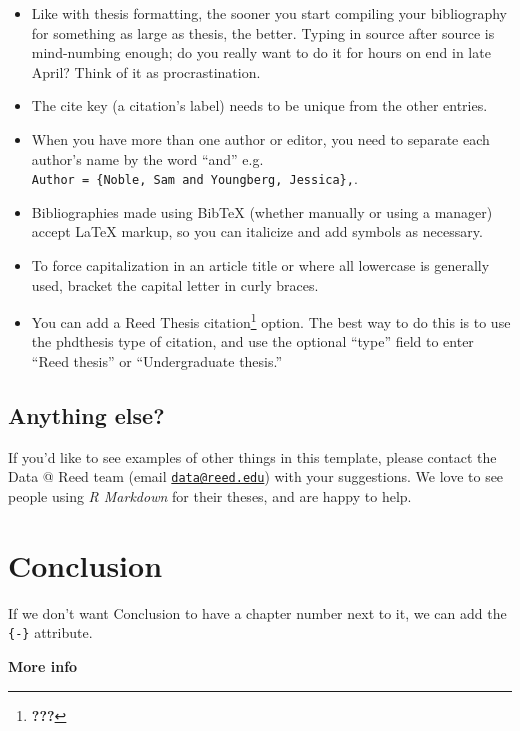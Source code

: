 \documentclass[12pt,twoside]{reedthesis}
\providecommand{\tightlist}{%
  \setlength{\itemsep}{0pt}\setlength{\parskip}{0pt}}
\theoremstyle{definition}
\theoremstyle{definition}
\theoremstyle{remark}
\begin{document}
  \begin{itemize}
  \tightlist
  \item
    Like with thesis formatting, the sooner you start compiling your
    bibliography for something as large as thesis, the better. Typing in
    source after source is mind-numbing enough; do you really want to do
    it for hours on end in late April? Think of it as procrastination.
  \item
    The cite key (a citation's label) needs to be unique from the other
    entries.
  \item
    When you have more than one author or editor, you need to separate
    each author's name by the word ``and'' e.g.
    \texttt{Author\ =\ \{Noble,\ Sam\ and\ Youngberg,\ Jessica\},}.
  \item
    Bibliographies made using BibTeX (whether manually or using a manager)
    accept LaTeX markup, so you can italicize and add symbols as
    necessary.
  \item
    To force capitalization in an article title or where all lowercase is
    generally used, bracket the capital letter in curly braces.
  \item
    You can add a Reed Thesis citation\footnote{\textbf{???}} option. The
    best way to do this is to use the phdthesis type of citation, and use
    the optional ``type'' field to enter ``Reed thesis'' or
    ``Undergraduate thesis.''
  \end{itemize}
  
  \section{Anything else?}\label{anything-else}
  
  If you'd like to see examples of other things in this template, please
  contact the Data @ Reed team (email
  \href{mailto:data@reed.edu}{\nolinkurl{data@reed.edu}}) with your
  suggestions. We love to see people using \emph{R Markdown} for their
  theses, and are happy to help.
  
  \chapter*{Conclusion}\label{conclusion}
  
  If we don't want Conclusion to have a chapter number next to it, we can
  add the \texttt{\{-\}} attribute.
  
  \textbf{More info}
  
\end{document}
